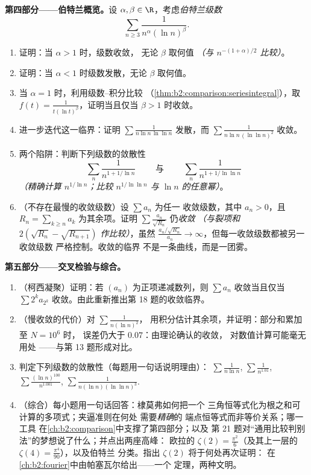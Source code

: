 \begin{problem}[{周末问题——$\zeta(2) = \pi^2/6$ 与
伯特兰全景}]
\medskip
\noindent\textbf{第四部分——伯特兰概览。}设 $\alpha,
\beta \in \R$，考虑\emph{伯特兰级数}
\[
\sum_{n \geq 3} \frac{1}{n^{\alpha}(\ln n)^{\beta}} .
\]
\begin{enumerate}[resume]
  \item 证明：当 $\alpha > 1$ 时，级数收敛，
        无论 $\beta$ 取何值 \emph{（与
        $n^{-(1+\alpha)/2}$ 比较）}。
  \item 证明：当 $\alpha < 1$ 时级数发散，无论
        $\beta$ 取何值。
  \item 当 $\alpha = 1$ 时，利用级数--积分比较
        （\cref{thm:b2:comparison:seriesintegral}），取 $f(t) =
        \frac{1}{t(\ln t)^\beta}$，证明当且仅当 $\beta
        > 1$ 时收敛。
  \item 进一步迭代这一临界：证明 $\sum\frac{1}{n\ln n\,\ln\ln
        n}$ 发散，而 $\sum\frac{1}{n\ln n\,(\ln\ln n)^2}$
        收敛。
  \item 两个陷阱：判断下列级数的敛散性
        \[
        \sum_n \frac{1}{n^{1 + 1/\ln n}}
        \qquad\text{ 与 }\qquad
        \sum_n \frac{1}{n^{1 + 1/\ln\ln n}}
        \]
        \emph{（精确计算 $n^{1/\ln n}$；比较
        $n^{1/\ln\ln n}$ 与 $\ln n$ 的任意幂）}。
  \item （不存在最慢的收敛级数）设 $\sum a_n$ 为任一
        收敛级数，其中 $a_n > 0$，且 $R_n = \sum_{k
        \geq n}a_k$ 为其余项。证明 $\sum
        \frac{a_n}{\sqrt{R_n}}$ 仍\emph{收敛}
        \emph{（与裂项和 $2(\sqrt{R_n} -
        \sqrt{R_{n+1}})$ 作比较）}，虽然 $\frac{a_n/\sqrt{R_n}}{a_n}
        \to \infty$，但每一收敛级数都被另一收敛级数
        严格控制。收敛的临界
        不是一条曲线，而是一团雾。
\end{enumerate}

\medskip
\noindent\textbf{第五部分——交叉检验与综合。}
\begin{enumerate}[resume]
  \item （柯西凝聚）证明：若 $(a_n)$ 为正项递减数列，则
        $\sum a_n$ 收敛当且仅当 $\sum 2^k a_{2^k}$
        收敛。由此重新推出第 18 题的收敛临界。
  \item （慢收敛的代价）对 $\sum\frac1{n(\ln n)^2}$，
        用积分估计其余项，并证明：部分和累加至 $N = 10^6$ 时，
        误差仍大于 $0.07$：由理论确认的收敛，
        对数值计算可能毫无用处
——与第 13 题形成对比。
  \item 判定下列级数的敛散性（每题用一句话说明理由）：
        $\sum\frac1{n\ln n}$, $\sum\frac1{n^{1.01}}$,
        $\sum\frac{(\ln n)^{100}}{n^{1.001}}$,
        $\sum\frac1{n(\ln n)(\ln\ln n)^{3}}$.
  \item （综合）每小题用一句话回答：棣莫弗如何把一个
        三角恒等式化为根之和可计算的多项式；夹逼准则在何处
        需要\emph{精确}的
        端点恒等式而非等价关系；哪一工具
        在\cref{ch:b2:comparison}中支撑了第四部分；以及
        第 21 题对“通用比较判别法”的梦想说了什么；并点出两座高峰：
        欧拉的
        $\zeta(2) = \frac{\pi^2}6$（及其上一层的
        $\zeta(4) = \frac{\pi^4}{90}$），以及伯特兰
        分类。指出 $\zeta(2)$ 将于何处再次证明：
        在\cref{ch:b2:fourier}中由帕塞瓦尔给出——一个
        定理，两种文明。
\end{enumerate}
\end{problem}
